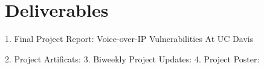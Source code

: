 \section{Deliverables}

1. Final Project Report: Voice-over-IP Vulnerabilities At UC Davis

2. Project Artificats: 
3. Biweekly Project Updates: 
4. Project Poster:


